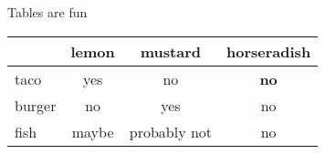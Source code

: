 \documentclass[xcolor=table]{beamer}
\begin{document}
\begin{frame}{Tables are fun}
    \begin{center}
        \begin{tabular}{l|ccc}
            \hline
            \hline
            & lemon & mustard & horseradish \\
            \hline
            taco & yes & no & \textbf{no} \\
            burger & no & yes & no \\
            fish & maybe & probably not & no \\
            \hline
            \hline
        \end{tabular}
    \end{center}
\end{frame}
\end{document}

